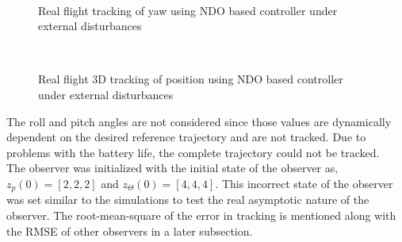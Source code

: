 \documentclass[letterpaper%
, twoside%
, 12pt%
,memoire%
, english%
,creativecommons,hyperref%
]{thETS}
\begin{document}
\begin{figure}[H]
	\centering
	 \\ \parbox{0.75\textwidth}{\caption{Real flight tracking of yaw using NDO based controller under external disturbances\label{Fig:yawtracNDODist}}}
\end{figure}
\begin{figure}[H]
	\centering
	 \\ \parbox{0.75\textwidth}{\caption{Real flight 3D tracking of position using NDO based controller under external disturbances\label{Fig:3dNDODist}}}
\end{figure}
The roll and pitch angles are not considered since those values are dynamically dependent on the desired reference trajectory and are not tracked. Due to problems with the battery life, the complete trajectory could not be tracked. \\
The observer was initialized with the initial state of the observer as, $z_p(0)=[2,2,2]$ and $z_\Theta(0)=[4,4,4]$. This incorrect state of the observer was set similar to the simulations to test the real asymptotic nature of the observer. The root-mean-square of the error in tracking is mentioned along with the RMSE of other observers in a later subsection.
\FloatBarrier
\end{document}

